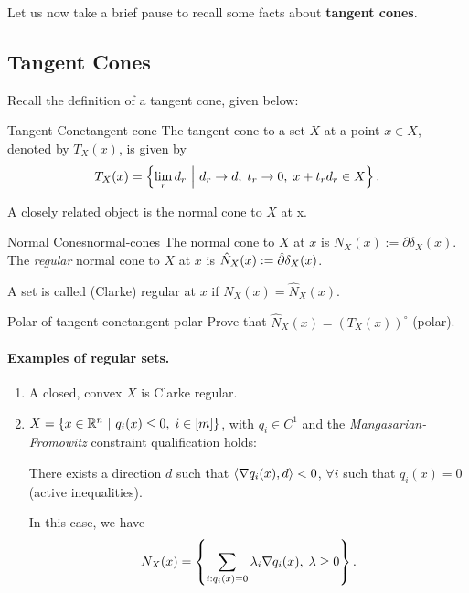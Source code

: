 Let us now take a brief pause to recall some facts about \textbf{tangent
cones}.

\subsection{Tangent Cones}

Recall the definition of a tangent cone, given below:
\begin{cdefinition}{Tangent Cone}{tangent-cone}
	The tangent cone to a set $X$ at a point $x \in X$, denoted by
	$T_{X}(x)$, is given by
	\[
		T_{X}(x) = \left\{ \lim_{r} d_r \ \middle| \  d_r \to d, \; t_r \to 0, \; x + t_r
		d_r \in X \right\}.
	\]
\end{cdefinition}
A closely related object is the normal cone to $X$ at x.
\begin{cdefinition}{Normal Cones}{normal-cones}
	The normal cone to $X$ at $x$ is $N_X(x) := \partial \delta_X(x)$. The
	\textit{regular} normal cone to $X$ at $x$ is $\hat{N}_{X}(x) := \hat{\partial}
	\delta_X(x)$.
\end{cdefinition}

\begin{remark}
	A set is called (Clarke) regular at $x$ if $N_X(x) = \hat{N}_X(x)$.
\end{remark}

\begin{exercise}{Polar of tangent cone}{tangent-polar}
	Prove that $\hat{N}_X(x) = \left(T_X(x)\right)^{\circ}$ (polar).
\end{exercise}

\paragraph{Examples of regular sets.}
\begin{enumerate}
	\item A closed, convex $X$ is Clarke regular.
	\item $X = \left\{ x \in \mathbb{R}^n \ \middle| \  q_i(x) \leq 0, \; i \in [m] \right\}$, 
		with $q_i \in C^1$ and the \textit{Mangasarian-Fromowitz} constraint
		qualification holds:
		\begin{definition}
			\label{defn:mang-from}
			There exists a direction $d$ such that $\left\langle \nabla q_i(x), d \right\rangle < 0$,
			$\forall i$ such that $q_i(x) = 0$ (active inequalities).
		\end{definition}
		In this case, we have
		\[
			N_X(x) = \left\{  \sum_{i: q_i(x) = 0} \lambda_i \nabla q_i(x), \;
			\lambda \geq 0 \right\}.
		\]
\end{enumerate}

